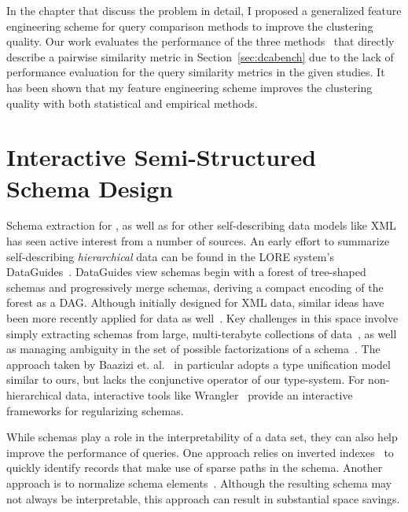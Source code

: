 In the chapter that discuss the problem in detail, I proposed a generalized feature engineering scheme for query comparison methods to improve the clustering quality.
Our work evaluates the performance of the three methods~\cite{aouiche2006, aligon2014similarity, makiyama2015text} that directly describe a pairwise similarity metric in Section~\ref{sec:dcabench} due to the lack of performance evaluation for the query similarity metrics in the given studies.
It has been shown that my feature engineering scheme improves the clustering quality with both statistical and empirical methods.

\section{Interactive Semi-Structured Schema Design}
Schema extraction for \json, as well as for other self-describing data models like XML has seen active interest from a number of sources. 
An early effort to summarize self-describing \emph{hierarchical} data can be found in the LORE system's DataGuides~\cite{DBLP:conf/vldb/GoldmanW97}.
DataGuides view schemas begin with a forest of tree-shaped schemas and progressively merge schemas, deriving a compact encoding of the forest as a DAG.
Although initially designed for XML data, similar ideas have been more recently applied for \json data as well~\cite{DBLP:conf/cidr/LiuG15,DBLP:conf/sigmod/LiuHMLC16}.
Key challenges in this space involve simply extracting schemas from large, multi-terabyte collections of \json data~\cite{DBLP:conf/edbt/BaaziziLCGS17}, as well as managing ambiguity in the set of possible factorizations of a schema~\cite{DBLP:conf/dbpl/BaaziziCGS17,spoth:2017:cidr:adaptive}.
The approach taken by Baazizi et. al.~\cite{DBLP:conf/edbt/BaaziziLCGS17} in particular adopts a type unification model similar to ours, but lacks the conjunctive operator of our type-system.
For non-hierarchical data, interactive tools like Wrangler~\cite{DBLP:conf/chi/KandelPHH11} provide an interactive frameworks for regularizing schemas.

While schemas play a role in the interpretability of a \json data set, they can also help improve the performance of \json queries.  
One approach relies on inverted indexes~\cite{DBLP:conf/cidr/LiuG15} to quickly identify records that make use of sparse paths in the schema.
Another approach is to normalize schema elements~\cite{DBLP:conf/sigmod/DiScalaA16}.  Although the resulting schema may not always be interpretable, this approach can result in substantial space savings.

